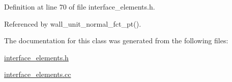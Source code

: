Definition at line 70 of file interface\+\_\+elements.\+h.



Referenced by wall\+\_\+unit\+\_\+normal\+\_\+fct\+\_\+pt().



The documentation for this class was generated from the following files\+:\begin{DoxyCompactItemize}
\item 
\hyperlink{interface__elements_8h}{interface\+\_\+elements.\+h}\item 
\hyperlink{interface__elements_8cc}{interface\+\_\+elements.\+cc}\end{DoxyCompactItemize}
